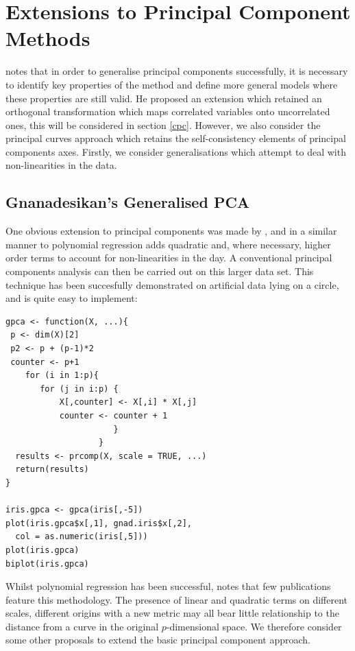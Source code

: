 \chapter{Extensions to Principal Component Methods}

\cite{Flury:1995} notes that in order to generalise principal components successfully, it is necessary to identify key properties of the method and define more general models where these properties are still valid.   He proposed an extension which retained an orthogonal transformation which maps correlated variables onto uncorrelated ones, this will be considered in section \ref{cpc}.   However, we also consider the principal curves approach which retains the self-consistency elements of principal components axes.   Firstly, we consider generalisations which attempt to deal with non-linearities in the data.

\section{Gnanadesikan's Generalised PCA}

One obvious extension to principal components was made by \cite{Gnanadesikan:1977}, and in a similar manner to polynomial regression adds quadratic and, where necessary, higher order terms to account for non-linearities in the day.   A conventional principal components analysis can then be carried out on this larger data set.   This technique has been succesfully demonstrated on artificial data lying on a circle, and is quite easy to implement:
\singlespacing
\begin{verbatim}
gpca <- function(X, ...){
 p <- dim(X)[2]
 p2 <- p + (p-1)*2
 counter <- p+1
    for (i in 1:p){
       for (j in i:p) {
           X[,counter] <- X[,i] * X[,j]
           counter <- counter + 1
                      }
                   }
  results <- prcomp(X, scale = TRUE, ...)
  return(results)
}

iris.gpca <- gpca(iris[,-5])
plot(iris.gpca$x[,1], gnad.iris$x[,2], 
  col = as.numeric(iris[,5]))
plot(iris.gpca)
biplot(iris.gpca)
\end{verbatim}
\onehalfspacing

Whilst polynomial regression has been successful, \cite{Flury:1995} notes that few publications feature this methodology.   The presence of linear and quadratic terms on different scales, different origins with a new metric may all bear little relationship to the distance from a curve in the original $p$-dimensional space.
We therefore consider some other proposals to extend the basic principal component approach.

